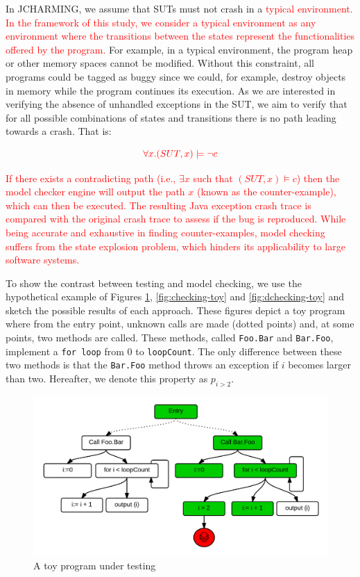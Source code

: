 \documentclass[times, doublespace]{smrauth}
\newcommand{\red}[1]{\textcolor{red}{#1}}
\begin{document}
In JCHARMING, we assume that SUTs
must not crash in a \red{typical environment.
In the framework of this study, we consider a typical environment
as any environment where the transitions between the states
represent the functionalities offered by the program.}
For example, in a typical environment, the program heap or other
memory spaces cannot be modified. Without this constraint,
all programs could be tagged as buggy since we could, for example,
destroy objects in memory while the program continues its execution.
As we are interested in verifying the absence of unhandled exceptions
in the SUT, we aim to verify that for all possible combinations of
states and transitions there is no path leading towards a crash. That is:

\begin{equation}
\red{\forall x.(SUT, x) \models \neg c}
\end{equation}

\red{If there exists a contradicting path (i.e., $\exists x$ such that $(SUT, x)
\models c$) then the model checker engine will output the path
$x$ (known as the counter-example), which can then be executed.
The resulting Java exception crash trace is compared with the original
crash trace to assess if the bug is reproduced.
While  being  accurate and exhaustive in finding counter-examples,
model checking suffers from the state explosion problem, which hinders
its applicability to large software systems.}


To show the contrast between testing and model checking, we use the hypothetical example of Figures \ref{fig:testing-toy}, \ref{fig:checking-toy} and \ref{fig:dchecking-toy} and sketch the possible results of each approach. These figures depict a toy program where from the entry point, unknown calls are made (dotted points) and, at some points, two methods are called. These methods, called \texttt{Foo.Bar} and \texttt{Bar.Foo}, implement a \texttt{for loop} from 0 to \texttt{loopCount}. The only difference between these two methods is that the \texttt{Bar.Foo} method throws an exception if $i$ becomes larger than two. Hereafter, we denote this property as $p_{i > 2}$.


\begin{figure}
  \centering
    \includegraphics[scale=0.7]{media/dmc.png}
    \caption{A toy program under testing
    \label{fig:testing-toy}}
\end{figure}
\end{document}
